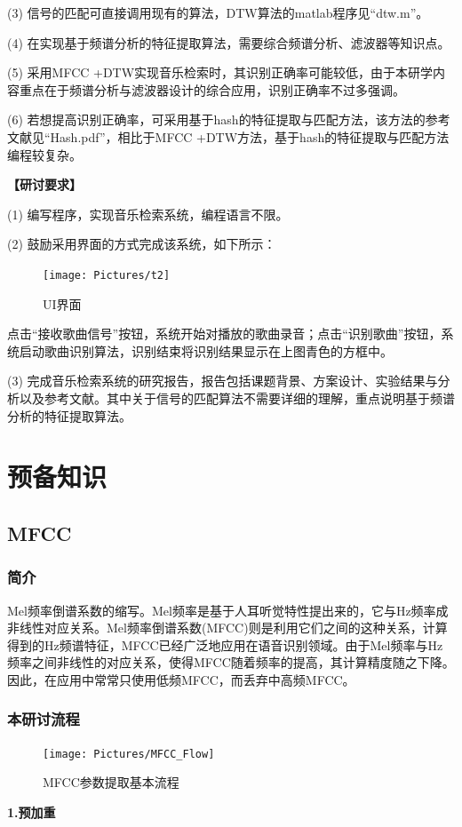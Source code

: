 \documentclass[11pt,a4paper,UTF8]{ctexart}
\begin{document}
	(3) 信号的匹配可直接调用现有的算法，DTW算法的matlab程序见“dtw.m”。

	(4) 在实现基于频谱分析的特征提取算法，需要综合频谱分析、滤波器等知识点。

	(5) 采用MFCC +DTW实现音乐检索时，其识别正确率可能较低，由于本研学内容重点在于频谱分析与滤波器设计的综合应用，识别正确率不过多强调。

	(6) 若想提高识别正确率，可采用基于hash的特征提取与匹配方法，该方法的参考文献见“Hash.pdf”，相比于MFCC +DTW方法，基于hash的特征提取与匹配方法编程较复杂。

	
	\textbf{【研讨要求】}

	(1) 编写程序，实现音乐检索系统，编程语言不限。

	(2) 鼓励采用界面的方式完成该系统，如下所示：

	\begin{figure}[H]
		\centering
		\texttt{[image: Pictures/t2]}
		\caption{UI界面}
		\label{fig:t2}
	\end{figure}
	
	点击“接收歌曲信号”按钮，系统开始对播放的歌曲录音；点击“识别歌曲”按钮，系统启动歌曲识别算法，识别结束将识别结果显示在上图青色的方框中。

	(3) 完成音乐检索系统的研究报告，报告包括课题背景、方案设计、实验结果与分析以及参考文献。其中关于信号的匹配算法不需要详细的理解，重点说明基于频谱分析的特征提取算法。	
	
	\section{预备知识}
	\subsection{MFCC}
	\subsubsection{简介}
	Mel频率倒谱系数的缩写。Mel频率是基于人耳听觉特性提出来的，它与Hz频率成非线性对应关系。Mel频率倒谱系数(MFCC)则是利用它们之间的这种关系，计算得到的Hz频谱特征，MFCC已经广泛地应用在语音识别领域。由于Mel频率与Hz频率之间非线性的对应关系，使得MFCC随着频率的提高，其计算精度随之下降。因此，在应用中常常只使用低频MFCC，而丢弃中高频MFCC。
	\subsubsection{本研讨流程}
	\begin{figure}[H]
		\centering
		\texttt{[image: Pictures/MFCC\_Flow]}
		\caption{MFCC参数提取基本流程}
		\label{fig:mfccflow}
	\end{figure}
	\textbf{1.预加重}
	
\end{document}
